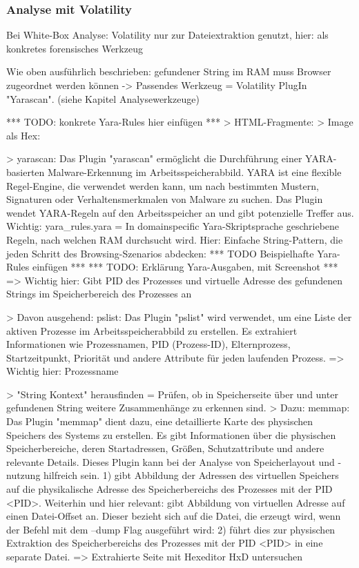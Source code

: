 \subsubsection*{Analyse mit Volatility}

Bei White-Box Analyse: Volatility nur zur Dateiextraktion genutzt, hier: als konkretes forensisches Werkzeug

Wie oben ausführlich beschrieben: gefundener String im RAM muss Browser zugeordnet werden können -> Passendes Werkzeug = Volatility PlugIn "Yarascan". (siehe Kapitel Analysewerkzeuge)

*** TODO: konkrete Yara-Rules hier einfügen ***
> HTML-Fragmente: \cite{Said.2011} 
> Image als Hex: \cite{Ohana.2013}

> yarascan: Das Plugin "yarascan" ermöglicht die Durchführung einer YARA-basierten Malware-Erkennung im Arbeitsspeicherabbild. YARA ist eine flexible Regel-Engine, die verwendet werden kann, um nach bestimmten Mustern, Signaturen oder Verhaltensmerkmalen von Malware zu suchen. Das Plugin wendet YARA-Regeln auf den Arbeitsspeicher an und gibt potenzielle Treffer aus.
		Wichtig: yara\_rules.yara = In domainspecific Yara-Skriptsprache geschriebene Regeln, nach welchen RAM durchsucht wird.
		Hier: Einfache String-Pattern, die jeden Schritt des Browsing-Szenarios abdecken:
		*** TODO Beispielhafte Yara-Rules einfügen ***
		*** TODO: Erklärung Yara-Ausgaben, mit Screenshot ***
	=> Wichtig hier: Gibt PID des Prozesses und virtuelle Adresse des gefundenen Strings im Speicherbereich des Prozesses an

> Davon ausgehend: pslist: 
Das Plugin "pslist" wird verwendet, um eine Liste der aktiven Prozesse im Arbeitsspeicherabbild zu erstellen. Es extrahiert Informationen wie Prozessnamen, PID (Prozess-ID), Elternprozess, Startzeitpunkt, Priorität und andere Attribute für jeden laufenden Prozess.
	=> Wichtig hier: Prozessname 	

> "String Kontext" herausfinden = Prüfen, ob in Speicherseite  über und unter gefundenen String weitere Zusammenhänge zu erkennen sind.
> Dazu: memmap: 
Das Plugin "memmap" dient dazu, eine detaillierte Karte des physischen Speichers des Systems zu erstellen. Es gibt Informationen über die physischen Speicherbereiche, deren Startadressen, Größen, Schutzattribute und andere relevante Details. Dieses Plugin kann bei der Analyse von Speicherlayout und -nutzung hilfreich sein.
		1) %
			gibt Abbildung der Adressen des virtuellen Speichers auf die physikalische Adresse des Speicherbereichs des Prozesses mit der PID <PID>.
			Weiterhin und hier relevant: gibt Abbildung von virtuellen Adresse auf einen Datei-Offset an. Dieser bezieht sich auf die Datei, die erzeugt wird, wenn der Befehl mit dem --dump Flag ausgeführt wird:
		2) %
			führt dies zur physischen Extraktion des Speicherbereichs des Prozesses mit der PID <PID> in eine separate Datei.		
 => Extrahierte Seite mit Hexeditor HxD untersuchen


